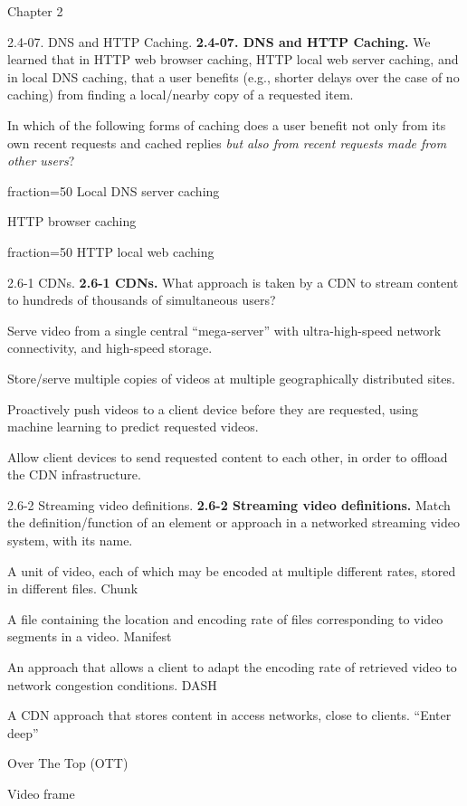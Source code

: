 \documentclass[11pt]{article}
\begin{document}
\begin{quiz}{Chapter 2}
\begin{multi}[points=1,shuffle,multiple]{2.4-07. DNS and HTTP Caching.}
\textbf{2.4-07. DNS and HTTP Caching.} 
We learned that in HTTP web browser caching, HTTP local web server caching, and in local DNS caching, that a user benefits (e.g., shorter delays over the case of no caching) from finding a local/nearby copy of a requested item. 

In which of the following forms of caching does a user benefit not only from its own recent requests and cached replies \emph{but also from recent requests made from other users}?
\item[fraction=50] Local DNS server caching
\item HTTP browser caching
\item[fraction=50] HTTP local web caching
\end{multi}

\begin{multi}[points=1,shuffle]{2.6-1 CDNs.}
\textbf{2.6-1 CDNs.} 
What approach is taken by a CDN to stream content to hundreds of thousands of simultaneous users?
\item Serve video from a single central ``mega-server'' with ultra-high-speed network connectivity, and high-speed storage.
\item* Store/serve multiple copies of videos at multiple geographically distributed sites.
\item Proactively push videos to a client device before they are requested, using machine learning to predict requested videos.
\item Allow client devices to send requested content to each other, in order to offload the CDN infrastructure.
\end{multi}

\begin{matching}[points=1,shuffle]{2.6-2 Streaming video definitions.}
\textbf{2.6-2 Streaming video definitions.} 
Match the definition/function of an element or approach in a networked streaming video system, with its name.
\item A unit of video, each of which may be encoded at multiple different rates, stored in different files. \answer Chunk
\item A file containing the location and encoding rate of files corresponding to video segments in a video. \answer Manifest
\item An approach that allows a client to adapt the encoding rate of retrieved video to network congestion conditions. \answer DASH
\item A CDN approach that stores content in access networks, close to clients. \answer ``Enter deep''
\item \answer Over The Top (OTT)
\item \answer Video frame
\end{matching}


\end{quiz}
\end{document}
